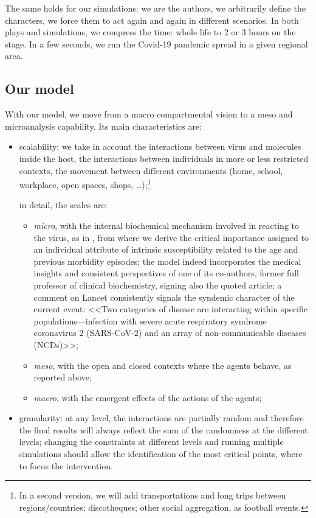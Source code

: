 \documentclass[11pt]{article}
\begin{document}
The same holds for our simulations: we are the authors, we arbitrarily define the characters, we force them to act again and again in different scenarios. In both plays and simulations, we compress the time: whole life to 2 or 3 hours on the stage. In a few seconds, we run the Covid-19 pandemic spread in a given regional area.

\subsection{Our model}

With our model, we move from a macro compartmental vision to a meso and microanalysis capability. Its main characteristics are:

\begin{itemize}

\item
scalability: we take in account the interactions between virus and molecules inside the host, the interactions between individuals in more or less restricted contexts, the movement between different environments (home, school, workplace, open spaces, shops, \ldots);\footnote{In a second version, we will add transportations and long trips between regions/countries; discotheques; other social aggregation, as football events.}

in detail, the scales are: 

\begin{itemize}
\setlength\itemsep{0.3em}
\item
	\emph{micro}, with the internal biochemical mechanism involved in reacting to the virus, as in \cite{Silvagno_2020}, from where we derive the critical importance assigned to an individual attribute of intrinsic susceptibility related to the age and previous morbidity episodes; the model indeed incorporates the medical insights and consistent perspectives of one of its co-authors, former full professor of clinical biochemistry, signing also the quoted article; a comment on Lancet \citep{horton2020offline} consistently signals the syndemic character of the current event: <<Two categories of disease are interacting within specific populations---infection with severe acute respiratory syndrome coronavirus 2 (SARS-CoV-2) and an array of non-communicable diseases (NCDs)>>;
\item
	\emph{meso}, with the open and closed contexts where the agents behave, as reported above;
\item	
	\emph{macro}, with the emergent effects of the actions of the agents;
	
\end{itemize}

\item
granularity: at any level, the interactions are partially random and therefore the final results will always reflect the sum of the randomness at the different levels; changing the constraints at different levels and running multiple simulations should allow the identification of the most critical points, where to focus the intervention.

\end{itemize}
\end{document}
